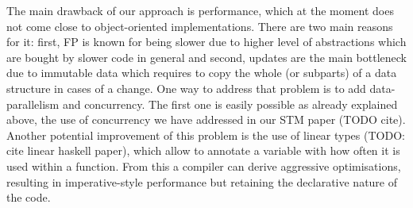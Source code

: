 The main drawback of our approach is performance, which at the moment does not come close to object-oriented implementations. There are two main reasons for it: first, FP is known for being slower due to higher level of abstractions which are bought by slower code in general and second, updates are the main bottleneck due to immutable data which requires to copy the whole (or subparts) of a data structure in cases of a change. One way to address that problem is to add data-parallelism and concurrency. The first one is easily possible as already explained above, the use of concurrency we have addressed in our STM paper (TODO cite). Another potential improvement of this problem is the use of linear types (TODO: cite linear haskell paper), which allow to annotate a variable with how often it is used within a function. From this a compiler can derive aggressive optimisations, resulting in imperative-style performance but retaining the declarative nature of the code.